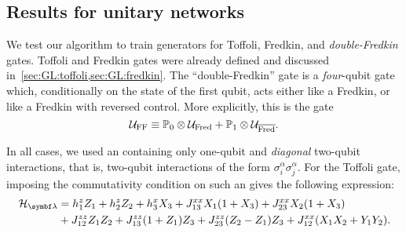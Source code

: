 \subsection{Results for unitary networks}
\label{subsec:GL:supervised_learning_results_noancillae}

We test our algorithm to train generators for Toffoli, Fredkin, and \emph{double-Fredkin} gates.
Toffoli and Fredkin gates were already defined and discussed in~\cref{sec:GL:toffoli,sec:GL:fredkin}.
The ``double-Fredkin'' gate is a \emph{four}-qubit gate which, conditionally on the state of the first qubit, acts either like a Fredkin, or like a Fredkin with reversed control. More explicitly, this is the gate
\begin{equation}
    {\mathcal{U}}_{\operatorname{FF}} \equiv {\mathbb{P}}_0\otimes {\mathcal{U}}_{\operatorname{Fred}} + {\mathbb{P}}_1\otimes {\mathcal{U}}_{\overline{\operatorname{Fred}}}.
\end{equation}

In all cases, we used an \ansatz containing only one-qubit and \emph{diagonal} two-qubit interactions, that is, two-qubit interactions of the form $\sigma_i^\alpha\sigma_j^\alpha$.
For the Toffoli gate, imposing the commutativity condition on such an \ansatz gives the following expression:
\begin{equation}
\begin{aligned}
    \calH_\bslambda &=
    h_1^z Z_1 + h_2^z Z_2 + h_3^x X_3 +
    J_{13}^{xx} X_1(1+X_3) +
    J_{23}^{xx} X_2(1+X_3) \\
    &+ J_{12}^{zz} Z_1 Z_2 +
    J_{13}^{zz} (1+Z_1)Z_3 +
    J_{23}^{zz} (Z_2 - Z_1)Z_3 +
    J_{12}^{xx} (X_1 X_2 + Y_1 Y_2).
\end{aligned}
\label{eq:GL:toffoli_reducd_ansatz_for_ML}
\end{equation}





